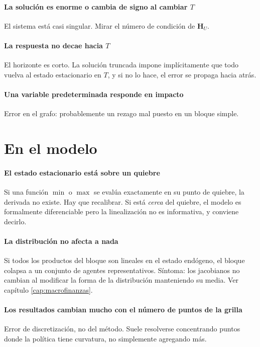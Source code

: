 \paragraph{La solución es enorme o cambia de signo al cambiar $T$} El sistema
está casi singular. Mirar el número de condición de $\mathbf{H}_U$.

\paragraph{La respuesta no decae hacia $T$} El horizonte es corto. La solución
truncada impone implícitamente que todo vuelva al estado estacionario en $T$, y
si no lo hace, el error se propaga hacia atrás.

\paragraph{Una variable predeterminada responde en impacto} Error en el grafo:
probablemente un rezago mal puesto en un bloque simple.

\section{En el modelo}

\paragraph{El estado estacionario está sobre un quiebre} Si una función $\min$ o
$\max$ se evalúa exactamente en su punto de quiebre, la derivada no existe. Hay
que recalibrar. Si está \emph{cerca} del quiebre, el modelo es formalmente
diferenciable pero la linealización no es informativa, y conviene decirlo.

\paragraph{La distribución no afecta a nada} Si todos los productos del bloque son
lineales en el estado endógeno, el bloque colapsa a un conjunto de agentes
representativos. Síntoma: los jacobianos no cambian al modificar la forma de la
distribución manteniendo su media. Ver capítulo \ref{cap:macrofinanzas}.

\paragraph{Los resultados cambian mucho con el número de puntos de la grilla}
Error de discretización, no del método. Suele resolverse concentrando puntos
donde la política tiene curvatura, no simplemente agregando más.
